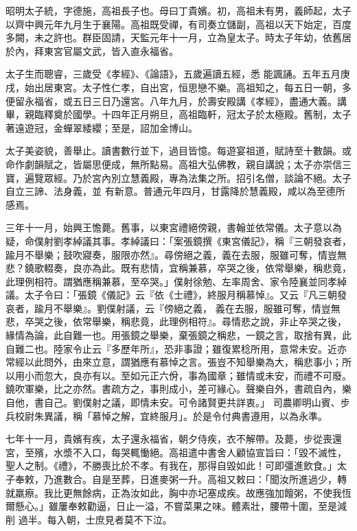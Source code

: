 
\begin{pinyinscope}

 昭明太子統，字德施，高祖長子也。母曰丁貴嬪。初，高祖未有男，義師起，太子以齊中興元年九月生于襄陽。高祖既受禪，有司奏立儲副，高祖以天下始定，百度多闕，未之許也。群臣固請，天監元年十一月，立為皇太子。時太子年幼，依舊居於內，拜東宮官屬文武，皆入直永福省。



 太子生而聰睿，三歲受《孝經》、《論語》，五歲遍讀五經，悉
 能諷誦。五年五月庚戌，始出居東宮。太子性仁孝，自出宮，恒思戀不樂。高祖知之，每五日一朝，多便留永福省，或五日三日乃還宮。八年九月，於壽安殿講《孝經》，盡通大義。講畢，親臨釋奠於國學。十四年正月朔旦，高祖臨軒，冠太子於太極殿。舊制，太子著遠遊冠，金蟬翠緌纓；至是，詔加金博山。



 太子美姿貌，善舉止。讀書數行並下，過目皆憶。每遊宴祖道，賦詩至十數韻。或命作劇韻賦之，皆屬思便成，無所點易。高祖大弘佛教，親自講說；太子亦崇信三寶，遍覽眾經。乃於宮內別立慧義殿，專為法集之所。招引名僧，談論不絕。太子自立三諦、法身義，並
 有新意。普通元年四月，甘露降於慧義殿，咸以為至德所感焉。



 三年十一月，始興王憺薨。舊事，以東宮禮絕傍親，書翰並依常儀。太子意以為疑，命僕射劉孝綽議其事。孝綽議曰：「案張鏡撰《東宮儀記》，稱『三朝發哀者，踰月不舉樂；鼓吹寢奏，服限亦然』。尋傍絕之義，義在去服，服雖可奪，情豈無悲？鐃歌輟奏，良亦為此。既有悲情，宜稱兼慕，卒哭之後，依常舉樂，稱悲竟，此理例相符。謂猶應稱兼慕，至卒哭。」僕射徐勉、左率周舍、家令陸襄並同孝綽議。太子令曰：「張鏡《儀記》云『依《士禮》，終服月稱慕悼』。又云『凡三朝發哀者，踰月不舉樂』。劉僕射議，云『傍絕之義，
 義在去服，服雖可奪，情豈無悲，卒哭之後，依常舉樂，稱悲竟，此理例相符』。尋情悲之說，非止卒哭之後，緣情為論，此自難一也。用張鏡之舉樂，棄張鏡之稱悲，一鏡之言，取捨有異，此自難二也。陸家令止云『多歷年所』，恐非事證；雖復累稔所用，意常未安。近亦常經以此問外，由來立意，謂猶應有慕悼之言。張豈不知舉樂為大，稱悲事小；所以用小而忽大，良亦有以。至如元正六佾，事為國章；雖情或未安，而禮不可廢。鐃吹軍樂，比之亦然。書疏方之，事則成小，差可緣心。聲樂自外，書疏自內，樂自他，書自己。劉僕射之議，即情未安。可令諸賢更共詳衷。」
 司農卿明山賓、步兵校尉朱異議，稱「慕悼之解，宜終服月」。於是令付典書遵用，以為永準。



 七年十一月，貴嬪有疾，太子還永福省，朝夕侍疾，衣不解帶。及薨，步從喪還宮，至殯，水漿不入口，每哭輒慟絕。高祖遣中書舍人顧協宣旨曰：「毀不滅性，聖人之制。《禮》，不勝喪比於不孝。有我在，那得自毀如此！可即彊進飲食。」太子奉敕，乃進數合。自是至葬，日進麥粥一升。高祖又敕曰：「聞汝所進過少，轉就羸瘵。我比更無餘病，正為汝如此，胸中亦圮塞成疾。故應強加饘粥，不使我恆爾懸心。」雖屢奉敕勸逼，日止一溢，不嘗菜果之味。體素壯，腰帶十圍，至是減削
 過半。每入朝，士庶見者莫不下泣。




\end{pinyinscope}
